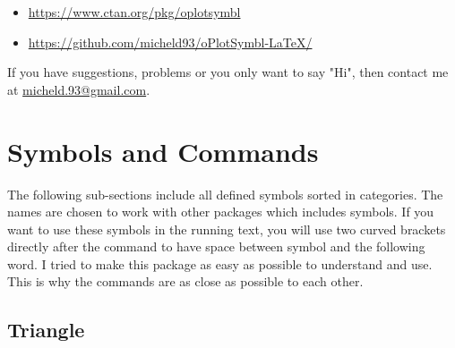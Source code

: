 \documentclass[
	a4paper,
	parskip=half,
    pagesize=auto,      		%
    listof=totoc,   		%
    bibliography=totoc,
	11pt
]{scrartcl}
\begin{document}
\begin{itemize}
    \item \url{https://www.ctan.org/pkg/oplotsymbl}
    \item \url{https://github.com/micheld93/oPlotSymbl-LaTeX/}  
\end{itemize}


If you have suggestions, problems or you only want to say "Hi", then contact me at \href{mailto:micheld.93@ gmail.com}{micheld.93@gmail.com}.


\section{Symbols and Commands}

The following sub-sections include all defined symbols sorted in categories. The names are chosen to work with other packages which includes symbols. If you want to use these symbols in the running text, you will use two curved brackets directly after the command to have space between symbol and the following word. I tried to make this package as easy as possible to understand and use. This is why the commands are as close as possible to each other.  


\subsection{Triangle}
\end{document}

